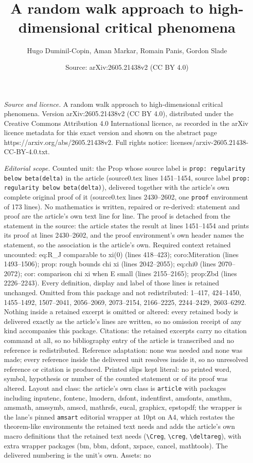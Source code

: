 \documentclass[10pt,a4paper]{amsart}
\title[A random walk approach to high-dimensional critical phenomen]{A random walk approach to high-dimensional critical phenomena}
\author{Hugo Duminil-Copin, Aman Markar, Romain Panis, Gordon Slade}
\date{Source: arXiv:2605.21438v2 (CC BY 4.0)}
\begin{document}
\maketitle

\noindent\emph{Source and licence.} A random walk approach to high-dimensional critical phenomena. Version arXiv:2605.21438v2 (CC BY 4.0), distributed under the Creative Commons Attribution 4.0 International licence, as recorded in the arXiv licence metadata for this exact version and shown on the abstract page https://arxiv.org/abs/2605.21438v2. Full rights notice: licenses/arxiv-2605.21438-CC-BY-4.0.txt.\par\smallskip

\noindent\textit{Editorial scope.} Counted unit: the Prop whose source label is \texttt{prop: regularity below beta(delta)} in the article (source0.tex lines 1451--1454, source label \texttt{prop: regularity below beta(delta)}), delivered together with the article's own complete original proof of it (source0.tex lines 2430--2602, one \texttt{proof} environment of 173 lines). No mathematics is written, repaired or re-derived: statement and proof are the article's own text line for line. The proof is detached from the statement in the source: the article states the result at lines 1451--1454 and prints its proof at lines 2430--2602, and the proof environment's own header names the statement, so the association is the article's own. Required context retained uncounted: eq:R\_J comparable to xi(0) (lines 418--423); coro:Miteration (lines 1493--1506); prop: rough bounds chi xi (lines 2042--2055); eq:chi0 (lines 2070--2072); cor: comparison chi xi when E small (lines 2155--2165); prop:Zbd (lines 2226--2243). Every definition, display and label of those lines is retained unchanged. Omitted from this package and not redistributed: 1--417, 424--1450, 1455--1492, 1507--2041, 2056--2069, 2073--2154, 2166--2225, 2244--2429, 2603--6292. Nothing inside a retained excerpt is omitted or altered: every retained body is delivered exactly as the article's lines are written, so no omission receipt of any kind accompanies this package. Citations: the retained excerpts carry no citation command at all, so no bibliography entry of the article is transcribed and no reference is redistributed. Reference adaptation: none was needed and none was made; every reference inside the delivered unit resolves inside it, so no unresolved reference or citation is produced. Printed slips kept literal: no printed word, symbol, hypothesis or number of the counted statement or of its proof was altered. Layout and class: the article's own class is \texttt{article} with packages including inputenc, fontenc, lmodern, dsfont, indentfirst, amsfonts, amsthm, amsmath, amssymb, amscd, mathrsfs, eucal, graphicx, epstopdf; the wrapper is the lane's pinned \texttt{amsart} editorial wrapper at 10pt on A4, which restates the theorem-like environments the retained text needs and adds the article's own macro definitions that the retained text needs (\texttt{\textbackslash Creg}, \texttt{\textbackslash creg}, \texttt{\textbackslash deltareg}), with extra wrapper packages (bm, bbm, dsfont, xspace, cancel, mathtools). The delivered numbering is the unit's own. Assets: no 
\end{document}

